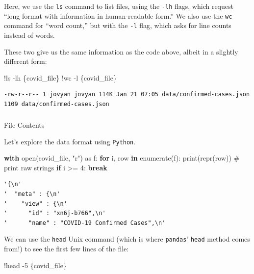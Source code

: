 \documentclass[
  letterpaper,
  DIV=11,
  numbers=noendperiod]{scrreprt}
\makeatletter
\let\oldsubparagraph\subparagraph
\renewcommand{\subparagraph}{
    \@ifstar
      \xxxSubParagraphStar
      \xxxSubParagraphNoStar
  }
\newcommand{\xxxSubParagraphStar}[1]{\oldsubparagraph*{#1}\mbox{}}
\newcommand{\xxxSubParagraphNoStar}[1]{\oldsubparagraph{#1}\mbox{}}
\newenvironment{Shaded}{\begin{snugshade}}{\end{snugshade}}
\newcommand{\BuiltInTok}[1]{\textcolor[rgb]{0.00,0.23,0.31}{#1}}
\newcommand{\CommentTok}[1]{\textcolor[rgb]{0.37,0.37,0.37}{#1}}
\newcommand{\ControlFlowTok}[1]{\textcolor[rgb]{0.00,0.23,0.31}{\textbf{#1}}}
\newcommand{\DecValTok}[1]{\textcolor[rgb]{0.68,0.00,0.00}{#1}}
\newcommand{\ImportTok}[1]{\textcolor[rgb]{0.00,0.46,0.62}{#1}}
\newcommand{\KeywordTok}[1]{\textcolor[rgb]{0.00,0.23,0.31}{\textbf{#1}}}
\newcommand{\NormalTok}[1]{\textcolor[rgb]{0.00,0.23,0.31}{#1}}
\newcommand{\OperatorTok}[1]{\textcolor[rgb]{0.37,0.37,0.37}{#1}}
\newcommand{\StringTok}[1]{\textcolor[rgb]{0.13,0.47,0.30}{#1}}
\makeatother
\begin{document}
Here, we use the \texttt{ls} command to list files, using the
\texttt{-lh} flags, which request ``long format with information in
human-readable form.'' We also use the \texttt{wc} command for ``word
count,'' but with the \texttt{-l} flag, which asks for line counts
instead of words.

These two give us the same information as the code above, albeit in a
slightly different form:

\begin{Shaded}
\begin{Highlighting}[]
\OperatorTok{!}\NormalTok{ls }\OperatorTok{{-}}\NormalTok{lh \{covid\_file\}}
\OperatorTok{!}\NormalTok{wc }\OperatorTok{{-}}\NormalTok{l \{covid\_file\}}
\end{Highlighting}
\end{Shaded}

\begin{verbatim}
-rw-r--r-- 1 jovyan jovyan 114K Jan 21 07:05 data/confirmed-cases.json
1109 data/confirmed-cases.json
\end{verbatim}

\subparagraph{File Contents}\label{file-contents}

Let's explore the data format using \texttt{Python}.

\begin{Shaded}
\begin{Highlighting}[]
\ControlFlowTok{with} \BuiltInTok{open}\NormalTok{(covid\_file, }\StringTok{"r"}\NormalTok{) }\ImportTok{as}\NormalTok{ f:}
    \ControlFlowTok{for}\NormalTok{ i, row }\KeywordTok{in} \BuiltInTok{enumerate}\NormalTok{(f):}
        \BuiltInTok{print}\NormalTok{(}\BuiltInTok{repr}\NormalTok{(row)) }\CommentTok{\# print raw strings}
        \ControlFlowTok{if}\NormalTok{ i }\OperatorTok{\textgreater{}=} \DecValTok{4}\NormalTok{: }\ControlFlowTok{break}
\end{Highlighting}
\end{Shaded}

\begin{verbatim}
'{\n'
'  "meta" : {\n'
'    "view" : {\n'
'      "id" : "xn6j-b766",\n'
'      "name" : "COVID-19 Confirmed Cases",\n'
\end{verbatim}

We can use the \texttt{head} Unix command (which is where
\texttt{pandas}' \texttt{head} method comes from!) to see the first few
lines of the file:

\begin{Shaded}
\begin{Highlighting}[]
\OperatorTok{!}\NormalTok{head }\OperatorTok{{-}}\DecValTok{5}\NormalTok{ \{covid\_file\}}
\end{Highlighting}
\end{Shaded}
\end{document}
